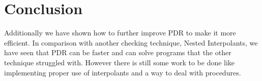\documentclass[11pt, a4paper, BCOR=10mm, ngerman]{scrbook}
\begin{document}
%    
%    
%    
%    
%    
%    
%    
%    
%    
%    
%
%    
%
%
%
%
%
%
%


\chapter{Conclusion}
 \par Additionally we have shown how to further improve PDR to make it more efficient. In comparison with another checking technique, Nested Interpolants, we have seen that PDR can be faster and can solve programs that the other technique struggled with. However there is still some work to be done like implementing proper use of interpolants and a way to deal with procedures.




\end{document}
